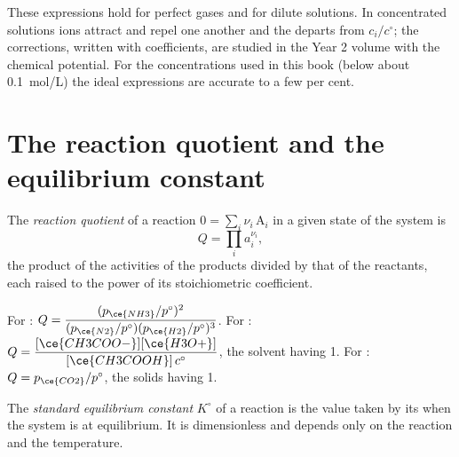 \begin{remark}\label{rem:b1:extent-q-and-k:ideal}
These expressions hold for perfect gases and for dilute solutions. In
concentrated solutions ions attract and repel one another and the
 departs from $c_i/c^\circ$; the corrections, written with
 coefficients, are studied in the Year 2 volume with the chemical
potential. For the concentrations used in this book (below about
\qty{0.1}{mol/L}) the ideal expressions are accurate to a few per cent.
\end{remark}

\section{The reaction quotient and the equilibrium constant}

\begin{definition}\label{def:b1:extent-q-and-k:quotient}
The \emph{reaction quotient} of a reaction
$0 = \sum_i \nu_i\,\mathrm{A}_i$ in a given state of the system is
\[
  Q = \prod_i a_i^{\nu_i} ,
\]
the product of the activities of the products divided by that of the
reactants, each raised to the power of its stoichiometric coefficient.
\end{definition}

\begin{example}\label{ex:b1:extent-q-and-k:quotients}
For : $Q = \dfrac{(p_{\ce{NH3}}/p^\circ)^2}
{(p_{\ce{N2}}/p^\circ)(p_{\ce{H2}}/p^\circ)^3}$. For
: $Q =
\dfrac{[\ce{CH3COO-}][\ce{H3O+}]}{[\ce{CH3COOH}]\,c^\circ}$, the solvent
having  1. For : $Q =
p_{\ce{CO2}}/p^\circ$, the solids having  1.
\end{example}

\begin{definition}\label{def:b1:extent-q-and-k:equilibrium-constant}
The \emph{standard equilibrium constant}
$K^\circ$ of a reaction is the value taken by its  when the system is at equilibrium. It is dimensionless and
depends only on the reaction and the temperature.
\end{definition}

